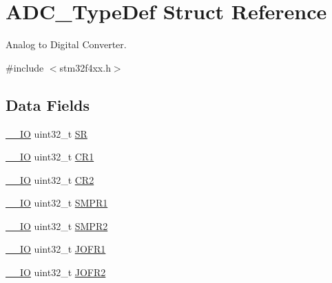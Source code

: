 \hypertarget{struct_a_d_c___type_def}{\section{A\-D\-C\-\_\-\-Type\-Def Struct Reference}
\label{struct_a_d_c___type_def}
}


Analog to Digital Converter.  




{\ttfamily \#include $<$stm32f4xx.\-h$>$}

\subsection*{Data Fields}
\begin{DoxyCompactItemize}
\item 
\hyperlink{group___c_m_s_i_s__core__definitions_gaec43007d9998a0a0e01faede4133d6be}{\-\_\-\-\_\-\-I\-O} uint32\-\_\-t \hyperlink{struct_a_d_c___type_def_af6aca2bbd40c0fb6df7c3aebe224a360}{S\-R}
\item 
\hyperlink{group___c_m_s_i_s__core__definitions_gaec43007d9998a0a0e01faede4133d6be}{\-\_\-\-\_\-\-I\-O} uint32\-\_\-t \hyperlink{struct_a_d_c___type_def_ab0ec7102960640751d44e92ddac994f0}{C\-R1}
\item 
\hyperlink{group___c_m_s_i_s__core__definitions_gaec43007d9998a0a0e01faede4133d6be}{\-\_\-\-\_\-\-I\-O} uint32\-\_\-t \hyperlink{struct_a_d_c___type_def_afdfa307571967afb1d97943e982b6586}{C\-R2}
\item 
\hyperlink{group___c_m_s_i_s__core__definitions_gaec43007d9998a0a0e01faede4133d6be}{\-\_\-\-\_\-\-I\-O} uint32\-\_\-t \hyperlink{struct_a_d_c___type_def_af9d6c604e365c7d9d7601bf4ef373498}{S\-M\-P\-R1}
\item 
\hyperlink{group___c_m_s_i_s__core__definitions_gaec43007d9998a0a0e01faede4133d6be}{\-\_\-\-\_\-\-I\-O} uint32\-\_\-t \hyperlink{struct_a_d_c___type_def_a6ac83fae8377c7b7fcae50fa4211b0e8}{S\-M\-P\-R2}
\item 
\hyperlink{group___c_m_s_i_s__core__definitions_gaec43007d9998a0a0e01faede4133d6be}{\-\_\-\-\_\-\-I\-O} uint32\-\_\-t \hyperlink{struct_a_d_c___type_def_a427dda1678f254bd98b1f321d7194a3b}{J\-O\-F\-R1}
\item 
\hyperlink{group___c_m_s_i_s__core__definitions_gaec43007d9998a0a0e01faede4133d6be}{\-\_\-\-\_\-\-I\-O} uint32\-\_\-t \hyperlink{struct_a_d_c___type_def_a11e65074b9f06b48c17cdfa5bea9f125}{J\-O\-F\-R2}
\item 

\end{DoxyCompactItemize}
